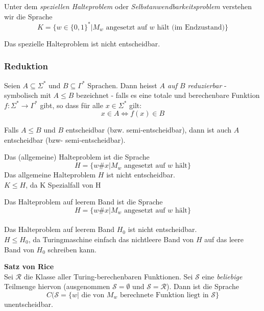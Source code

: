 \documentclass{scrartcl}
\begin{document}
\begin{shaded}
    Unter dem \emph{speziellen Halteproblem} oder \emph{Selbstanwendbarkeitsproblem} verstehen wir die Sprache
    \[ K=\{w\in\{0,1\}^* | M_w \textrm{ angesetzt auf } w \textrm{ hält (im Endzustand)}\} \]
\end{shaded}

\begin{shaded}
    Das spezielle Halteproblem ist nicht entscheidbar.
\end{shaded}

\subsubsection*{Reduktion}
\begin{shaded}
    Seien $A\subseteq\Sigma^*$ und $B\subseteq\Gamma^*$ Sprachen. Dann heisst \emph{$A$ auf $B$ reduzierbar} - symbolisch mit $A\leq B$ bezeichnet - falls es eine totale und berechenbare Funktion $f:\Sigma^*\to\Gamma^*$ gibt, so dass für alle $x\in\Sigma^*$ gilt:
    \[ x\in A \Longleftrightarrow f(x)\in B \]
\end{shaded}

\begin{shaded}
    Falls $A\leq B$ und $B$ entscheidbar (bzw. semi-entscheidbar), dann ist auch $A$ entscheidbar (bzw- semi-entscheidbar).
\end{shaded}

\begin{shaded}
    Das (allgemeine) Halteproblem ist die Sprache \[H=\{w\#x | M_w \textrm{ angesetzt auf } w \textrm{ hält}\} \]
    Das allgemeine Halteproblem $H$ ist nicht entscheidbar.\\
    {\tiny $K\leq H$, da K Spezialfall von H}
\end{shaded}

\begin{shaded}
    Das Halteproblem auf leerem Band ist die Sprache \[H=\{w\#x | M_w \textrm{ angesetzt auf } w \textrm{ hält}\} \] \\
    Das Halteproblem auf leerem Band $H_0$ ist nicht entscheidbar. \\
    {\tiny $H\leq H_0$, da Turingmaschine einfach das nichtleere Band von $H$ auf das leere Band von $H_0$ schreiben kann.}

    \begin{shaded}
        \textbf{Satz von Rice}\\
        Sei $\mathcal{R}$ die Klasse aller Turing-berechenbaren Funktionen. Sei $\mathcal{S}$ eine \emph{beliebige} Teilmenge hiervon (ausgenommen $\mathcal{S}=\emptyset$ und $\mathcal{S}=\mathcal{R}$). Dann ist die Sprache \[ C(\mathcal{S} = \{w | \textrm{ die von } M_w \textrm{ berechnete Funktion liegt in } \mathcal{S}\} \] unentscheidbar.
    \end{shaded}
\end{shaded}
\end{document}

